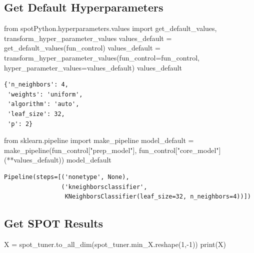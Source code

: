 \documentclass[
  letterpaper,
  DIV=11,
  numbers=noendperiod]{scrreprt}
\newenvironment{Shaded}{\begin{snugshade}}{\end{snugshade}}
\newcommand{\BuiltInTok}[1]{\textcolor[rgb]{0.00,0.23,0.31}{#1}}
\newcommand{\DecValTok}[1]{\textcolor[rgb]{0.68,0.00,0.00}{#1}}
\newcommand{\ImportTok}[1]{\textcolor[rgb]{0.00,0.46,0.62}{#1}}
\newcommand{\NormalTok}[1]{\textcolor[rgb]{0.00,0.23,0.31}{#1}}
\newcommand{\OperatorTok}[1]{\textcolor[rgb]{0.37,0.37,0.37}{#1}}
\newcommand{\StringTok}[1]{\textcolor[rgb]{0.13,0.47,0.30}{#1}}
\begin{document}
\hypertarget{get-default-hyperparameters-6}{%
\subsection{Get Default
Hyperparameters}\label{get-default-hyperparameters-6}}

\begin{Shaded}
\begin{Highlighting}[]
\ImportTok{from}\NormalTok{ spotPython.hyperparameters.values }\ImportTok{import}\NormalTok{ get\_default\_values, transform\_hyper\_parameter\_values}
\NormalTok{values\_default }\OperatorTok{=}\NormalTok{ get\_default\_values(fun\_control)}
\NormalTok{values\_default }\OperatorTok{=}\NormalTok{ transform\_hyper\_parameter\_values(fun\_control}\OperatorTok{=}\NormalTok{fun\_control, hyper\_parameter\_values}\OperatorTok{=}\NormalTok{values\_default)}
\NormalTok{values\_default}
\end{Highlighting}
\end{Shaded}

\begin{verbatim}
{'n_neighbors': 4,
 'weights': 'uniform',
 'algorithm': 'auto',
 'leaf_size': 32,
 'p': 2}
\end{verbatim}

\begin{Shaded}
\begin{Highlighting}[]
\ImportTok{from}\NormalTok{ sklearn.pipeline }\ImportTok{import}\NormalTok{ make\_pipeline}
\NormalTok{model\_default }\OperatorTok{=}\NormalTok{ make\_pipeline(fun\_control[}\StringTok{"prep\_model"}\NormalTok{], fun\_control[}\StringTok{"core\_model"}\NormalTok{](}\OperatorTok{**}\NormalTok{values\_default))}
\NormalTok{model\_default}
\end{Highlighting}
\end{Shaded}

\begin{verbatim}
Pipeline(steps=[('nonetype', None),
                ('kneighborsclassifier',
                 KNeighborsClassifier(leaf_size=32, n_neighbors=4))])
\end{verbatim}

\hypertarget{get-spot-results-5}{%
\subsection{Get SPOT Results}\label{get-spot-results-5}}

\begin{Shaded}
\begin{Highlighting}[]
\NormalTok{X }\OperatorTok{=}\NormalTok{ spot\_tuner.to\_all\_dim(spot\_tuner.min\_X.reshape(}\DecValTok{1}\NormalTok{,}\OperatorTok{{-}}\DecValTok{1}\NormalTok{))}
\BuiltInTok{print}\NormalTok{(X)}
\end{Highlighting}
\end{Shaded}
\end{document}
